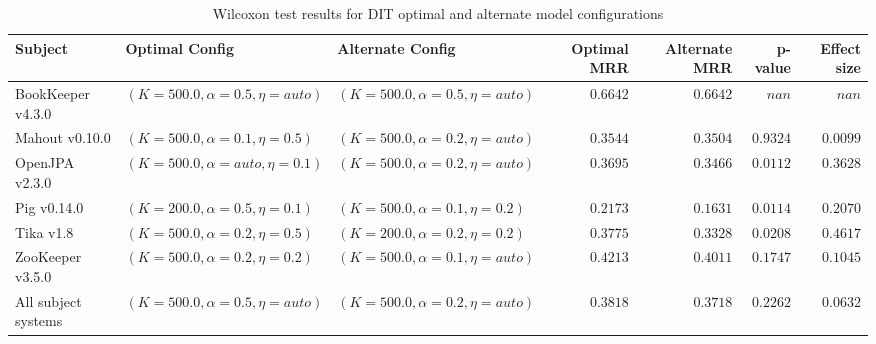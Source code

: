 
\begin{table}
\begin{spacing}{1.2}
\centering
\caption{Wilcoxon test results for DIT optimal and alternate model configurations}
\label{table:combo-dit-model-sweep-wilcox}
\begin{tabular}{lllrrrr}
\toprule
                      Subject &                      Optimal Config &                    Alternate Config & Optimal MRR & Alternate MRR &  p-value & Effect size \\
\midrule
            BookKeeper v4.3.0 &  $(K=500.0, \alpha=0.5, \eta=auto)$ &  $(K=500.0, \alpha=0.5, \eta=auto)$ &    $0.6642$ &      $0.6642$ &    $nan$ &       $nan$ \\
               Mahout v0.10.0 &   $(K=500.0, \alpha=0.1, \eta=0.5)$ &  $(K=500.0, \alpha=0.2, \eta=auto)$ &    $0.3544$ &      $0.3504$ & $0.9324$ &    $0.0099$ \\
               OpenJPA v2.3.0 &  $(K=500.0, \alpha=auto, \eta=0.1)$ &  $(K=500.0, \alpha=0.2, \eta=auto)$ &    $0.3695$ &      $0.3466$ & $0.0112$ &    $0.3628$ \\
                  Pig v0.14.0 &   $(K=200.0, \alpha=0.5, \eta=0.1)$ &   $(K=500.0, \alpha=0.1, \eta=0.2)$ &    $0.2173$ &      $0.1631$ & $0.0114$ &    $0.2070$ \\
                    Tika v1.8 &   $(K=500.0, \alpha=0.2, \eta=0.5)$ &   $(K=200.0, \alpha=0.2, \eta=0.2)$ &    $0.3775$ &      $0.3328$ & $0.0208$ &    $0.4617$ \\
             ZooKeeper v3.5.0 &   $(K=500.0, \alpha=0.2, \eta=0.2)$ &  $(K=500.0, \alpha=0.1, \eta=auto)$ &    $0.4213$ &      $0.4011$ & $0.1747$ &    $0.1045$ \\
 \midrule
All subject systems &  $(K=500.0, \alpha=0.5, \eta=auto)$ &  $(K=500.0, \alpha=0.2, \eta=auto)$ &    $0.3818$ &      $0.3718$ & $0.2262$ &    $0.0632$ \\
\bottomrule
\end{tabular}

\end{spacing}
\end{table}

